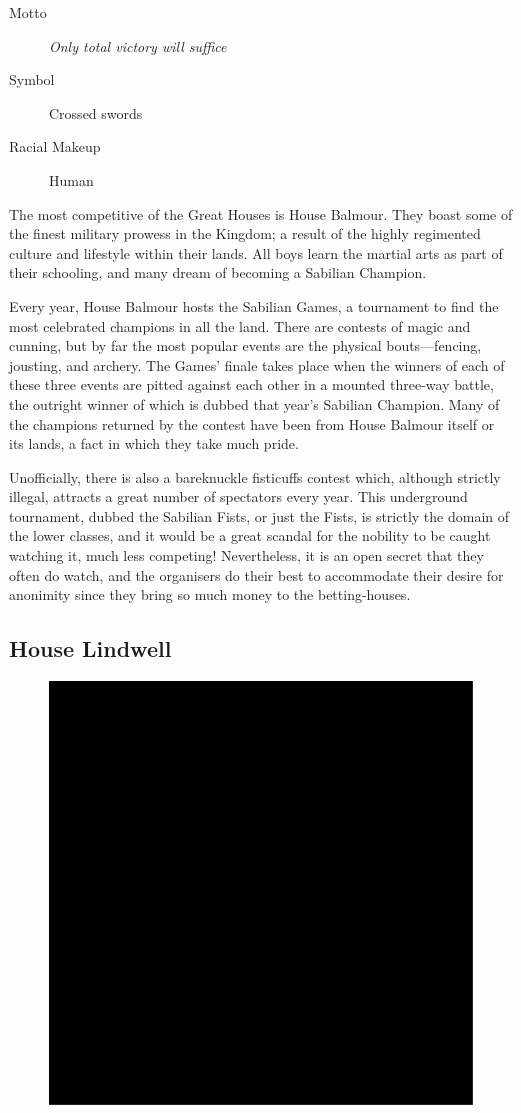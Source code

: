 \documentclass[10pt,twoside,openright,a4paper,twocolumn]{book}
\begin{document}
\begin{description}
\item[Motto] \textit{Only total victory will suffice}

\item[Symbol] Crossed swords

\item[Racial Makeup] Human
\end{description}

The most competitive of the Great Houses is House Balmour.  They boast
some of the finest military prowess in the Kingdom; a result of the highly
regimented culture and lifestyle within their lands.  All boys learn the martial
arts as part of their schooling, and many dream of becoming a Sabilian
Champion.

Every year, House Balmour hosts the Sabilian Games, a tournament to find
the most celebrated champions in all the land.  There are contests of magic
and cunning, but by far the most popular events are the physical bouts---fencing,
jousting, and archery.  The Games' finale takes place when the winners
of each of these three events are pitted against each other in a mounted
three-way battle, the outright winner of which is dubbed that year's Sabilian
Champion.  Many of the champions returned by the contest have been from
House Balmour itself or its lands, a fact in which they take much pride.

Unofficially, there is also a bareknuckle fisticuffs contest which, although
strictly illegal, attracts a great number of spectators every year.  This underground
tournament, dubbed the Sabilian Fists, or just the Fists, is strictly the domain
of the lower classes, and it would be a great scandal for the nobility to be caught
watching it, much less competing!  Nevertheless, it is an open secret that they
often do watch, and the organisers do their best to accommodate their desire for
anonimity since they bring so much money to the betting-houses.

\subsection*{House Lindwell}

\begin{figure}
  \includegraphics[width=0.48\columnwidth]{images/HouseLindwell}
\end{figure}
\end{document}
